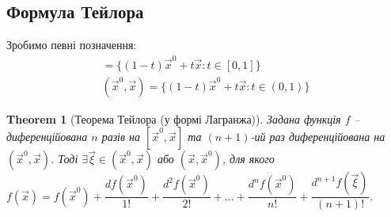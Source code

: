 \documentclass[a4paper, 10pt]{article}
\theoremstyle{theoremdd}
\newtheorem{theorem}{Theorem}[subsection]
\theoremstyle{theoremdd}
\theoremstyle{theoremdd}
\theoremstyle{theoremdd}
\theoremstyle{theoremdd}
\theoremstyle{theoremdd}
\theoremstyle{theoremdd}
\theoremstyle{theoremdd}
\theoremstyle{theoremdd}
\begin{document}
\subsection{Формула Тейлора}
Зробимо певні позначення:
\begin{align*}
[\vec{x}^0, \vec{x}] = \{(1-t)\vec{x}^0 + t \vec{x} : t \in [0,1]\} \\
(\vec{x}^0, \vec{x}) = \{(1-t)\vec{x}^0 + t \vec{x} : t \in (0,1)\}
\end{align*}

\begin{theorem}[Теорема Тейлора (у формі Лагранжа)]
Задана функція $f$ -- диференційована $n$ разів на $[\vec{x}^0,\vec{x}]$ та $(n+1)$-ий раз диференційована на $(\vec{x}^0,\vec{x})$. Тоді $\exists \vec{\xi} \in (\vec{x}^0,\vec{x})$ або $(\vec{x},\vec{x}^0)$, для якого\\
$f(\vec{x}) = f(\vec{x}^0) + \dfrac{df(\vec{x}^0)}{1!} + \dfrac{d^2 f(\vec{x}^0)}{2!} + \dots  + \dfrac{d^{n} f(\vec{x}^0)}{n!} + \dfrac{d^{n+1} f(\vec{\xi})}{(n+1)!}$.
\end{theorem}
\end{document}
